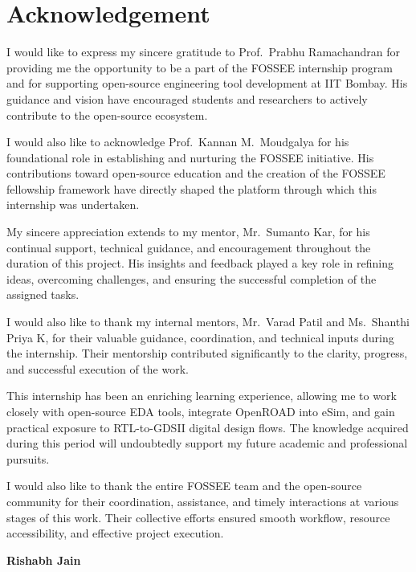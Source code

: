 \chapter*{Acknowledgement}

\noindent
I would like to express my sincere gratitude to Prof.~Prabhu Ramachandran for providing me the opportunity to be a part of the FOSSEE internship program and for supporting open-source engineering tool development at IIT Bombay. His guidance and vision have encouraged students and researchers to actively contribute to the open-source ecosystem.

\vspace{0.3cm}

\noindent
I would also like to acknowledge Prof.~Kannan M.~Moudgalya for his foundational role in establishing and nurturing the FOSSEE initiative. His contributions toward open-source education and the creation of the FOSSEE fellowship framework have directly shaped the platform through which this internship was undertaken.

\vspace{0.3cm}

\noindent
My sincere appreciation extends to my mentor, Mr.~Sumanto Kar, for his continual support, technical guidance, and encouragement throughout the duration of this project. His insights and feedback played a key role in refining ideas, overcoming challenges, and ensuring the successful completion of the assigned tasks.

\vspace{0.3cm}

\noindent
I would also like to thank my internal mentors, Mr.~Varad Patil and Ms.~Shanthi Priya K, for their valuable guidance, coordination, and technical inputs during the internship. Their mentorship contributed significantly to the clarity, progress, and successful execution of the work.

\vspace{0.3cm}

\noindent
This internship has been an enriching learning experience, allowing me to work closely with open-source EDA tools, integrate OpenROAD into eSim, and gain practical exposure to RTL-to-GDSII digital design flows. The knowledge acquired during this period will undoubtedly support my future academic and professional pursuits.

\vspace{0.3cm}

\noindent
I would also like to thank the entire FOSSEE team and the open-source community for their coordination, assistance, and timely interactions at various stages of this work. Their collective efforts ensured smooth workflow, resource accessibility, and effective project execution.

\vspace{1.5cm}

\begin{flushright}
\textbf{Rishabh Jain}
\end{flushright}
